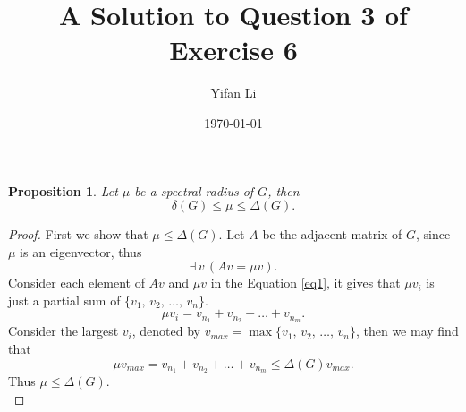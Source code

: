 \documentclass{article}
\title{\vspace{-2cm} A Solution to Question 3 of Exercise 6}
\author{Yifan Li}
\date{\today}
\newtheorem{proposition}{\bf Proposition}
\begin{document}
\maketitle

\begin{proposition}
    Let $\mu$ be a spectral radius of $G$, then
    \begin{equation*}
        \delta(G)\leq\mu\leq\Delta(G).
    \end{equation*}
\end{proposition}

\begin{proof}
    First we show that $\mu\leq\Delta(G)$. Let $A$ be the adjacent matrix of $G$, since $\mu$ is an eigenvector, thus
    \begin{equation}\label{eq1}
        \exists\, v\,(Av=\mu v).
    \end{equation}
    Consider each element of $Av$ and $\mu v$ in the Equation \eqref{eq1}, it gives that $\mu v_i$ is just a partial sum of $\{v_1,\,v_2,\,\ldots,\,v_n\}$.
    \begin{equation*}
        \mu v_i = v_{n_1}+v_{n_2}+\ldots+v_{n_m}.
    \end{equation*}
    Consider the largest $v_i$, denoted by $v_{max}=\max{\{v_1,\,v_2,\,\ldots,\,v_n\}}$, then we may find that
    \begin{equation*}
        \mu v_{max}=v_{n_1}+v_{n_2}+\ldots+v_{n_m}\leq\Delta(G)v_{max}.
    \end{equation*}
    Thus $\mu\leq\Delta(G)$.\\


\end{proof}
\end{document}
